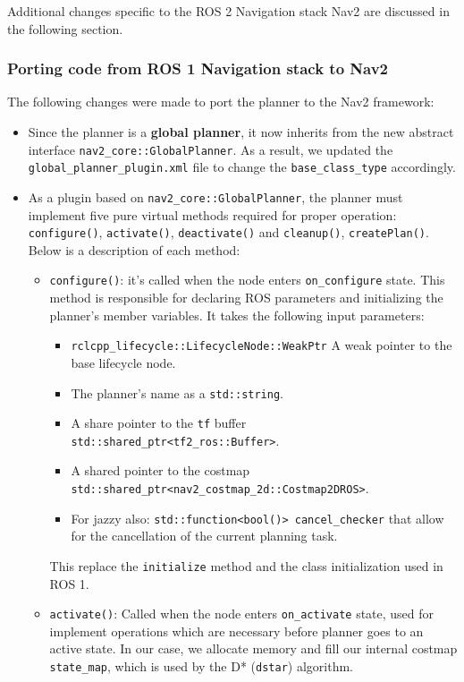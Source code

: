 Additional changes specific to the ROS 2 Navigation stack Nav2 are discussed in the following section.

\subsubsection{Porting code from ROS 1 Navigation stack to Nav2}
The following changes were made to port the planner to the Nav2 framework:
\begin{itemize}
	\item Since the planner is a \textbf{global planner}, it now inherits from the new abstract interface \texttt{nav2\_core::GlobalPlanner}. As a result, we updated the\\ \texttt{global\_planner\_plugin.xml} file to change the \texttt{base\_class\_type} accordingly.
	\item As a plugin based on \texttt{nav2\_core::GlobalPlanner}, the planner must implement five pure virtual methods required for proper operation: \texttt{configure()}, \texttt{activate()}, \texttt{deactivate()} and \texttt{cleanup()}, \texttt{createPlan()}. Below is a description of each method:
	\begin{itemize}
		\item \texttt{configure()}: it's called when the node enters \texttt{on\_configure} state. This method is responsible for declaring ROS parameters and initializing the planner's member variables. It takes the following input parameters:
		\begin{itemize}
			\item \texttt{rclcpp\_lifecycle::LifecycleNode::WeakPtr}  A weak pointer to the base lifecycle node.
			\item The planner’s name as a \texttt{std::string}.
			\item A share pointer to the \texttt{tf} buffer\\ \texttt{std::shared\_ptr<tf2\_ros::Buffer>}.
			\item A shared pointer to the costmap\\ \texttt{std::shared\_ptr<nav2\_costmap\_2d::Costmap2DROS>}.
			\item For jazzy also: \texttt{std::function<bool()> cancel\_checker} that allow for the cancellation of the current planning task.
		\end{itemize}
		This replace the \texttt{initialize} method and the class initialization used in ROS 1.
		\item \texttt{activate()}: Called when the node enters \texttt{on\_activate} state, used for implement operations which are necessary before planner goes to an active state. In our case, we allocate memory and fill our internal costmap \texttt{state\_map}, which is used by the D* (\texttt{dstar}) algorithm.

\end{itemize}
\end{itemize}
